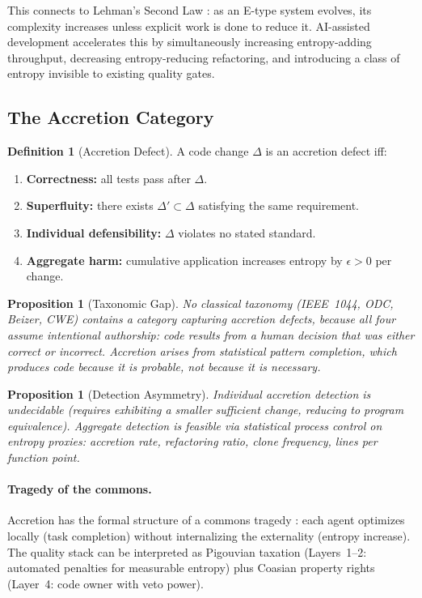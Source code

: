 \documentclass[11pt, a4paper]{article}
\newtheorem{proposition}[theorem]{Proposition}
\theoremstyle{definition}
\newtheorem{definition}[theorem]{Definition}
\theoremstyle{remark}
\begin{document}
This connects to Lehman's Second Law \citep{lehman1980}: as an E-type system evolves, its complexity increases unless explicit work is done to reduce it. AI-assisted development accelerates this by simultaneously increasing entropy-adding throughput, decreasing entropy-reducing refactoring, and introducing a class of entropy invisible to existing quality gates.

\subsection{The Accretion Category}

\begin{definition}[Accretion Defect]
\label{def:accretion}
A code change $\Delta$ is an accretion defect iff:
\begin{enumerate}[leftmargin=2em]
\item \textbf{Correctness:} all tests pass after $\Delta$.
\item \textbf{Superfluity:} there exists $\Delta' \subset \Delta$ satisfying the same requirement.
\item \textbf{Individual defensibility:} $\Delta$ violates no stated standard.
\item \textbf{Aggregate harm:} cumulative application increases entropy by $\epsilon > 0$ per change.
\end{enumerate}
\end{definition}

\begin{proposition}[Taxonomic Gap]
\label{prop:taxgap}
No classical taxonomy (IEEE~1044, ODC, Beizer, CWE) contains a category capturing accretion defects, because all four assume intentional authorship: code results from a human decision that was either correct or incorrect. Accretion arises from statistical pattern completion, which produces code because it is \emph{probable}, not because it is \emph{necessary}.
\end{proposition}

\begin{proposition}[Detection Asymmetry]
Individual accretion detection is undecidable (requires exhibiting a smaller sufficient change, reducing to program equivalence). Aggregate detection is feasible via statistical process control on entropy proxies: accretion rate, refactoring ratio, clone frequency, lines per function point.
\end{proposition}

\paragraph{Tragedy of the commons.} Accretion has the formal structure of a commons tragedy \citep{hardin1968}: each agent optimizes locally (task completion) without internalizing the externality (entropy increase). The quality stack can be interpreted as Pigouvian taxation (Layers~1--2: automated penalties for measurable entropy) plus Coasian property rights (Layer~4: code owner with veto power).
\end{document}
